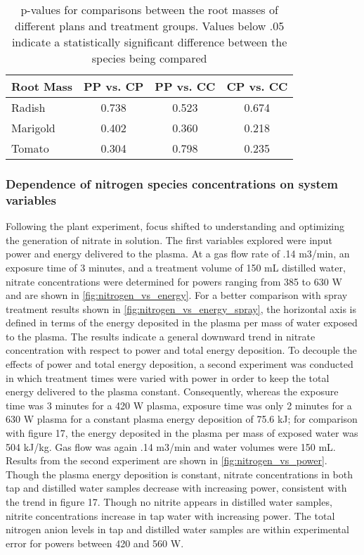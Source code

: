 \begin{table}[htpb]
  \begin{center}
    \begin{tabular}{|l |c |c |c |}
      \hline
      Root Mass & PP vs. CP & PP vs. CC & CP vs. CC \\\hline
      Radish & 0.738 & 0.523 & 0.674 \\\hline
      Marigold & 0.402 & 0.360 & 0.218 \\\hline
      Tomato & 0.304 & 0.798 & 0.235 \\\hline
    \end{tabular}
  \end{center}
  \caption{p-values for comparisons between the root masses of different plans and treatment groups. Values below .05 indicate a statistically significant difference between the species being compared}
  \label{tab:root_t}
\end{table}

\subsubsection{Dependence of nitrogen species concentrations on system variables}

Following the plant experiment, focus shifted to understanding and optimizing the generation of nitrate in solution.  The first variables explored were input power and energy delivered to the plasma.  At a gas flow rate of .14 m3/min, an exposure time of 3 minutes, and a treatment volume of 150 mL distilled water, nitrate concentrations were determined for powers ranging from 385 to 630 W and are shown in \cref{fig:nitrogen_vs_energy}.  For a better comparison with spray treatment results shown in \cref{fig:nitrogen_vs_energy_spray}, the horizontal axis is defined in terms of the energy deposited in the plasma per mass of water exposed to the plasma.  The results indicate a general downward trend in nitrate concentration with respect to power and total energy deposition.   To decouple the effects of power and total energy deposition, a second experiment was conducted in which treatment times were varied with power in order to keep the total energy delivered to the plasma constant.  Consequently, whereas the exposure time was 3 minutes for a 420 W plasma, exposure time was only 2 minutes for a 630 W plasma for a constant plasma energy deposition of 75.6 kJ; for comparison with figure 17, the energy deposited in the plasma per mass of exposed water was 504 kJ/kg.  Gas flow was again .14 m3/min and water volumes were 150 mL.  Results from the second experiment are shown in \cref{fig:nitrogen_vs_power}.  Though the plasma energy deposition is constant, nitrate concentrations in both tap and distilled water samples decrease with increasing power, consistent with the trend in figure 17.  Though no nitrite appears in distilled water samples, nitrite concentrations increase in tap water with increasing power.  The total nitrogen anion levels in tap and distilled water samples are within experimental error for powers between 420 and 560 W.


